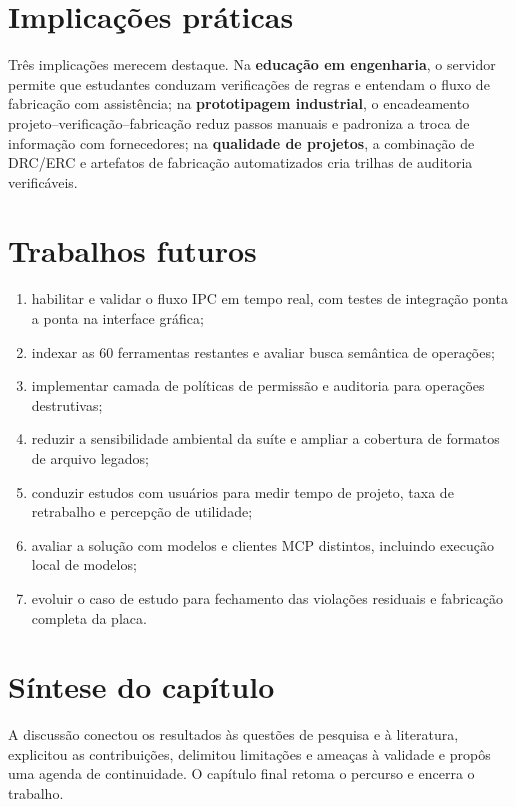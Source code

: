 \section{Implicações práticas}

Três implicações merecem destaque. Na \textbf{educação em engenharia}, o
servidor permite que estudantes conduzam verificações de regras e
entendam o fluxo de fabricação com assistência; na \textbf{prototipagem
industrial}, o encadeamento projeto--verificação--fabricação reduz passos
manuais e padroniza a troca de informação com fornecedores; na
\textbf{qualidade de projetos}, a combinação de DRC/ERC e artefatos de
fabricação automatizados cria trilhas de auditoria verificáveis.

\section{Trabalhos futuros}

\begin{enumerate}[leftmargin=1.4em,itemsep=0.2em]
  \item habilitar e validar o fluxo IPC em tempo real, com testes de
        integração ponta a ponta na interface gráfica;
  \item indexar as 60 ferramentas restantes e avaliar busca semântica de
        operações;
  \item implementar camada de políticas de permissão e auditoria para
        operações destrutivas;
  \item reduzir a sensibilidade ambiental da suíte e ampliar a cobertura de
        formatos de arquivo legados;
  \item conduzir estudos com usuários para medir tempo de projeto, taxa de
        retrabalho e percepção de utilidade;
  \item avaliar a solução com modelos e clientes MCP distintos, incluindo
        execução local de modelos;
  \item evoluir o caso de estudo para fechamento das violações residuais e
        fabricação completa da placa.
\end{enumerate}

\section{Síntese do capítulo}

A discussão conectou os resultados às questões de pesquisa e à literatura,
explicitou as contribuições, delimitou limitações e ameaças à validade e
propôs uma agenda de continuidade. O capítulo final retoma o percurso e
encerra o trabalho.
